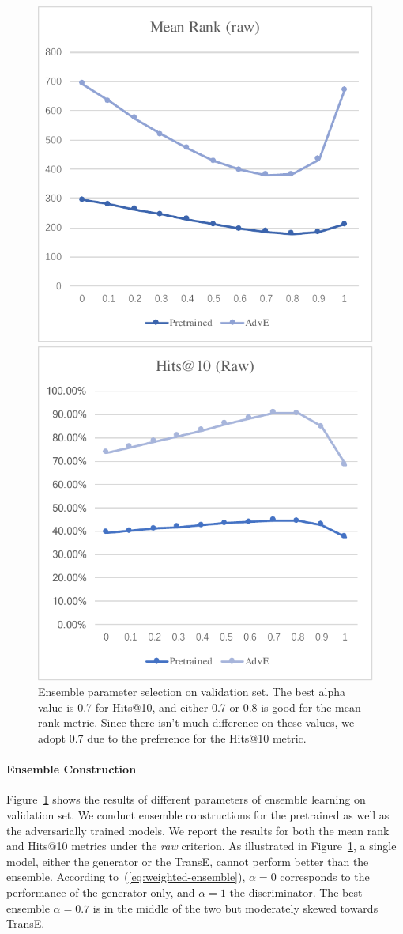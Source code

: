 \documentclass[twocolumn,a4paper,preprint,10pt,3p]{elsarticle}
\begin{document}
\begin{figure}[htb]
    \centering
    \parbox[b]{\columnwidth}{
        \centering
        \includegraphics[width=.3\textwidth]{ensemble-mean-rank.pdf}
        \subcaption{}        
    }
    \parbox[b]{\columnwidth}{
        \centering
        \includegraphics[width=.3\textwidth]{ensemble-hit10.pdf}
        \subcaption{}
    }
    \caption{Ensemble parameter selection on validation set. The best alpha value is 0.7 for Hits@10, and either 0.7 or 0.8 is good for the mean rank metric. Since there isn't much difference on these values, we adopt 0.7 due to the preference for the Hits@10 metric.}
\label{fig:ensemble}
\end{figure}

\paragraph{Ensemble Construction} Figure~\ref{fig:ensemble} shows the results of different parameters of ensemble learning on validation set. We conduct ensemble constructions for the pretrained as well as the adversarially trained models. We report the results for both the mean rank and Hits@10 metrics under the \emph{raw} criterion. As illustrated in Figure~\ref{fig:ensemble}, a single model, either the generator or the TransE, cannot perform better than the ensemble. According to~(\ref{eq:weighted-ensemble}), $\alpha=0$ corresponds to the performance of the generator only, and $\alpha=1$ the discriminator. The best ensemble $\alpha=0.7$ is in the middle of the two but moderately skewed towards TransE.


\end{document}
